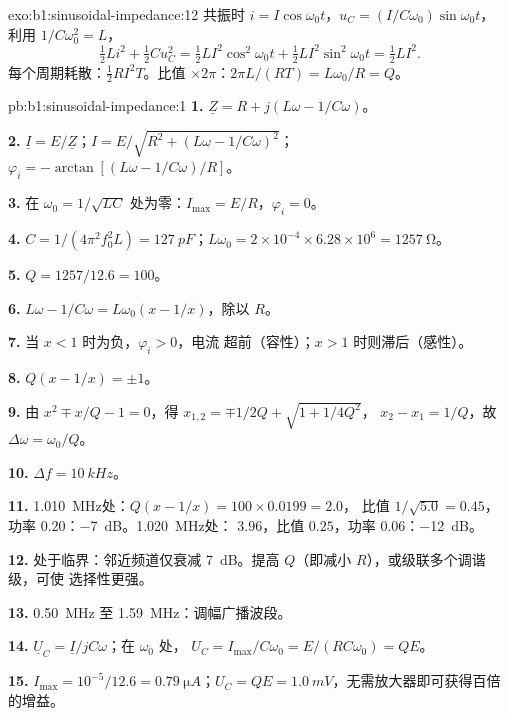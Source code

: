 \begin{solution}{exo:b1:sinusoidal-impedance:12}
共振时 $i = I\cos\omega_0 t$，$u_C = (I/C\omega_0)\sin\omega_0 t$，
利用 $1/C\omega_0^2 = L$，
\[
\tfrac12 Li^2 + \tfrac12 Cu_C^2 = \tfrac12 LI^2\cos^2\omega_0 t
+ \tfrac12 LI^2\sin^2\omega_0 t = \tfrac12 LI^2 .
\]
每个周期耗散：$\tfrac12 RI^2T$。比值 $\times 2\pi$：$2\pi L/(RT)
= L\omega_0/R = Q$。
\end{solution}

\begin{solution}{pb:b1:sinusoidal-impedance:1}
\textbf{1.} $\underline Z = R + j(L\omega - 1/C\omega)$。

\textbf{2.} $\underline I = E/\underline Z$；$I = E/\sqrt{R^2 + (L\omega -
1/C\omega)^2}$；$\varphi_i = -\arctan[(L\omega - 1/C\omega)/R]$。

\textbf{3.} 在 $\omega_0 = 1/\sqrt{LC}$ 处为零：$I_{\max}
= E/R$，$\varphi_i = 0$。

\textbf{4.} $C = 1/(4\pi^2f_0^2L) = \qty{127}{pF}$；$L\omega_0 = 2\times10^{-4}
\times 6.28\times10^6 = \qty{1257}{\ohm}$。

\textbf{5.} $Q = 1257/12.6 = 100$。

\textbf{6.} $L\omega - 1/C\omega = L\omega_0(x - 1/x)$，除以 $R$。

\textbf{7.} 当 $x < 1$ 时为负，$\varphi_i > 0$，电流
超前（容性）；$x > 1$ 时则滞后（感性）。

\textbf{8.} $Q(x - 1/x) = \pm1$。

\textbf{9.} 由 $x^2 \mp x/Q - 1 = 0$，得 $x_{1,2} = \mp1/2Q + \sqrt{1 + 1/4Q^2}$，
$x_2 - x_1 = 1/Q$，故 $\Delta\omega = \omega_0/Q$。

\textbf{10.} $\Delta f = \qty{10}{kHz}$。

\textbf{11.} \qty{1.010}{MHz}处：$Q(x - 1/x) = 100 \times 0.0199 = 2.0$，
比值 $1/\sqrt{5.0} = 0.45$，功率 $0.20$：\qty{-7}{dB}。\qty{1.020}{MHz}处：
$3.96$，比值 $0.25$，功率 $0.06$：\qty{-12}{dB}。

\textbf{12.} 处于临界：邻近频道仅衰减 \qty{7}{dB}。提高
$Q$（即减小 $R$），或级联多个调谐级，可使
选择性更强。

\textbf{13.} \qty{0.50}{MHz} 至 \qty{1.59}{MHz}：调幅广播波段。

\textbf{14.} $\underline U_C = \underline I/jC\omega$；在 $\omega_0$ 处，
$U_C = I_{\max}/C\omega_0 = E/(RC\omega_0) = QE$。

\textbf{15.} $I_{\max} = 10^{-5}/12.6 = \qty{0.79}{\micro A}$；$U_C = QE =
\qty{1.0}{mV}$，无需放大器即可获得百倍的增益。


\end{solution}
